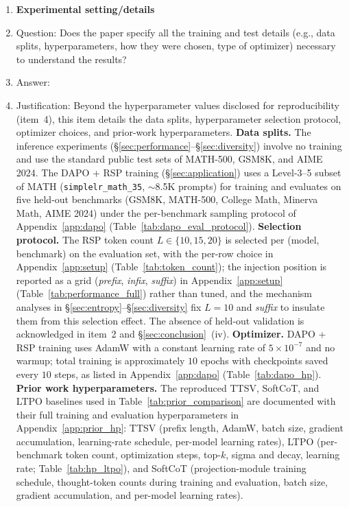 \begin{enumerate}
\item {\bf Experimental setting/details}
    \item[] Question: Does the paper specify all the training and test details (e.g., data splits, hyperparameters, how they were chosen, type of optimizer) necessary to understand the results?
    \item[] Answer: \answerYes{}
    \item[] Justification: Beyond the hyperparameter values disclosed for reproducibility (item~4), this item details the data splits, hyperparameter selection protocol, optimizer choices, and prior-work hyperparameters. \textbf{Data splits.} The inference experiments (\S\ref{sec:performance}--\S\ref{sec:diversity}) involve no training and use the standard public test sets of MATH-500, GSM8K, and AIME 2024. The DAPO + RSP training (\S\ref{sec:application}) uses a Level-3--5 subset of MATH (\texttt{simplelr\_math\_35}, $\sim$8.5K prompts) for training and evaluates on five held-out benchmarks (GSM8K, MATH-500, College Math, Minerva Math, AIME 2024) under the per-benchmark sampling protocol of Appendix~\ref{app:dapo} (Table~\ref{tab:dapo_eval_protocol}). \textbf{Selection protocol.} The RSP token count $L\in\{10,15,20\}$ is selected per (model, benchmark) on the evaluation set, with the per-row choice in Appendix~\ref{app:setup} (Table~\ref{tab:token_count}); the injection position is reported as a grid (\textit{prefix}, \textit{infix}, \textit{suffix}) in Appendix~\ref{app:setup} (Table~\ref{tab:performance_full}) rather than tuned, and the mechanism analyses in \S\ref{sec:entropy}--\S\ref{sec:diversity} fix $L=10$ and \textit{suffix} to insulate them from this selection effect. The absence of held-out validation is acknowledged in item~2 and \S\ref{sec:conclusion}~(iv). \textbf{Optimizer.} DAPO + RSP training uses AdamW with a constant learning rate of $5\times10^{-7}$ and no warmup; total training is approximately $10$ epochs with checkpoints saved every $10$ steps, as listed in Appendix~\ref{app:dapo} (Table~\ref{tab:dapo_hp}). \textbf{Prior work hyperparameters.} The reproduced TTSV, SoftCoT, and LTPO baselines used in Table~\ref{tab:prior_comparison} are documented with their full training and evaluation hyperparameters in Appendix~\ref{app:prior_hp}: TTSV (prefix length, AdamW, batch size, gradient accumulation, learning-rate schedule, per-model learning rates), LTPO (per-benchmark token count, optimization steps, top-$k$, sigma and decay, learning rate; Table~\ref{tab:hp_ltpo}), and SoftCoT (projection-module training schedule, thought-token counts during training and evaluation, batch size, gradient accumulation, and per-model learning rates).


\end{enumerate}
